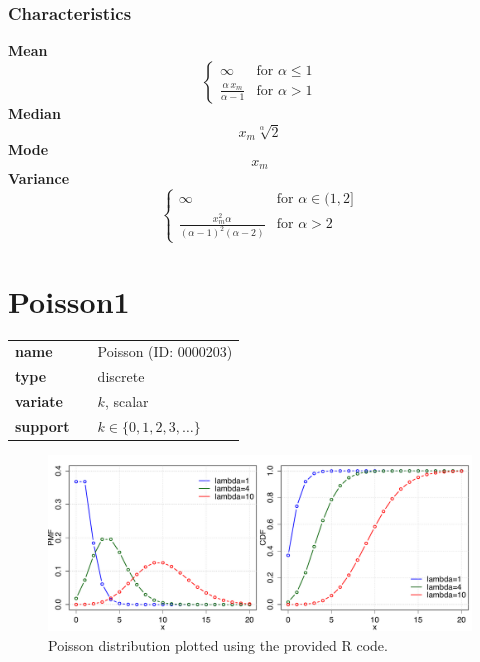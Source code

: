 \subsubsection*{Characteristics}
\smallskip \noindent \hspace{.2cm} \textbf{Mean} 
\begin{equation*}\begin{cases}
\infty & \text{for }\alpha\le 1 \\
\frac{\alpha\,x_m}{\alpha-1} & \text{for }\alpha>1
\end{cases}\end{equation*}
\smallskip \noindent \hspace{.2cm} \textbf{Median} 
\begin{equation*}x_m \sqrt[\alpha]{2}\end{equation*}
\smallskip \noindent \hspace{.2cm} \textbf{Mode} 
\begin{equation*}x_m\end{equation*}
\smallskip \noindent \hspace{.2cm} \textbf{Variance} 
\begin{equation*}\begin{cases}
     \infty & \text{for }\alpha\in(1,2] \\
     \frac{x_m^2\alpha}{(\alpha-1)^2(\alpha-2)} & \text{for }\alpha>2
   \end{cases}\end{equation*}
\smallskip
\section*{Poisson1} 

  \bigskip 

\begin{tabular}{p{2cm}cl}
\textbf{name} & & Poisson (ID: 0000203)\\ 
 
\textbf{type} & & discrete \\ 

\textbf{variate} & & $k$, scalar \\ 

\textbf{support} & & $k \in \{0,1,2,3,\dots\}$
\end{tabular}

\begin{figure}[ht!]
\centering
  \includegraphics[width=140mm]{pics/Poisson.pdf}
 \caption{Poisson distribution plotted using the provided R code.}
 \label{fig:Poisson}
\end{figure}

